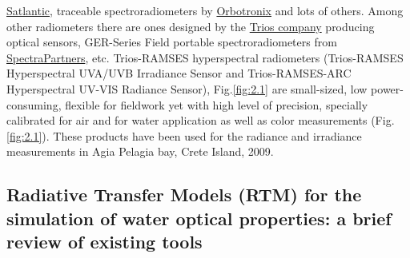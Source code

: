 \documentclass[11pt]{article}
\begin{document}
\href{http://www.satlantic.com}{Satlantic}, traceable spectroradiometers by \href{http://www.orboptronix.com}{Orbotronix} 
and lots of others. Among other radiometers there are ones designed by the \href{http://www.trios.de/}{Trios company} producing
optical sensors, GER-Series Field portable spectroradiometers from
\href{http://www.spectrapartners.nl/}{SpectraPartners}, etc. \ac{Trios-RAMSES} hyperspectral radiometers
(\ac{Trios-RAMSES} Hyperspectral \ac{UVA}/\ac{UVB} Irradiance Sensor and \ac{Trios-RAMSES}-ARC Hyperspectral \ac{UV}-\ac{VIS} Radiance Sensor), Fig.\ref{fig:2.1} are small-sized, low power-consuming, flexible for fieldwork yet with high
level of precision, specially calibrated for air and for water application as well as color
measurements  (Fig.\ref{fig:2.1})\label{page-13}. These products have been used for the radiance and irradiance
measurements in Agia Pelagia bay, Crete Island, 2009.

\subsection[Radiative Transfer Models (RTM)]{Radiative Transfer Models (RTM) for the simulation of water optical properties: a brief review of existing tools}\label{sec:2-3}
\end{document}
